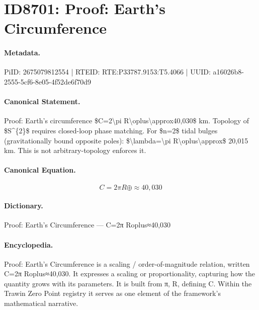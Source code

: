 \section*{ID8701: Proof: Earth's Circumference}
\paragraph{Metadata.}
PiID: 2675079812554 | RTEID: RTE:P33787.9153:T5.4066 | UUID: a16026b8-2555-5cf6-8e05-4f52de6f70d9

\paragraph{Canonical Statement.}
Proof: Earth's circumference \$C=2\textbackslash{}pi R\textbackslash{}oplus\textbackslash{}approx40,030\$ km. Topology of \$S\textasciicircum{}\{2\}\$ requires closed-loop phase matching. For \$n=2\$ tidal bulges (gravitationally bound opposite poles): \$\textbackslash{}lambda=\textbackslash{}pi R\textbackslash{}oplus\textbackslash{}approx\$ 20,015 km. This is not arbitrary-topology enforces it.

\paragraph{Canonical Equation.}
\[
C=2\pi R\oplus\approx40,030
\]

\paragraph{Dictionary.}
Proof: Earth's Circumference — C=2π Roplus≈40,030

\paragraph{Encyclopedia.}
Proof: Earth's Circumference is a scaling / order-of-magnitude relation, written C=2π Roplus≈40,030. It expresses a scaling or proportionality, capturing how the quantity grows with its parameters. It is built from π, R, defining C. Within the Trawin Zero Point registry it serves as one element of the framework's mathematical narrative.
